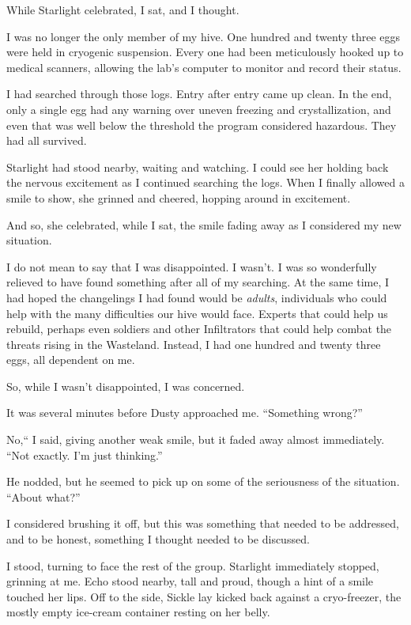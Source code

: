 While Starlight celebrated, I sat, and I thought.

I was no longer the only member of my hive. One hundred and twenty three eggs were held in cryogenic suspension. Every one had been meticulously hooked up to medical scanners, allowing the lab’s computer to monitor and record their status.

I had searched through those logs. Entry after entry came up clean. In the end, only a single egg had any warning over uneven freezing and crystallization, and even that was well below the threshold the program considered hazardous. They had all survived.

Starlight had stood nearby, waiting and watching. I could see her holding back the nervous excitement as I continued searching the logs. When I finally allowed a smile to show, she grinned and cheered, hopping around in excitement.

And so, she celebrated, while I sat, the smile fading away as I considered my new situation.

I do not mean to say that I was disappointed. I wasn’t. I was so wonderfully relieved to have found something after all of my searching. At the same time, I had hoped the changelings I had found would be \textit{adults}, individuals who could help with the many difficulties our hive would face. Experts that could help us rebuild, perhaps even soldiers and other Infiltrators that could help combat the threats rising in the Wasteland. Instead, I had one hundred and twenty three eggs, all dependent on me.

So, while I wasn’t disappointed, I was concerned.

It was several minutes before Dusty approached me. “Something wrong?”

\leavevmode{}No,“ I said, giving another weak smile, but it faded away almost immediately. “Not exactly. I’m just thinking.”

He nodded, but he seemed to pick up on some of the seriousness of the situation. “About what?”

I considered brushing it off, but this was something that needed to be addressed, and to be honest, something I thought needed to be discussed.

I stood, turning to face the rest of the group. Starlight immediately stopped, grinning at me. Echo stood nearby, tall and proud, though a hint of a smile touched her lips. Off to the side, Sickle lay kicked back against a cryo-freezer, the mostly empty ice-cream container resting on her belly.

